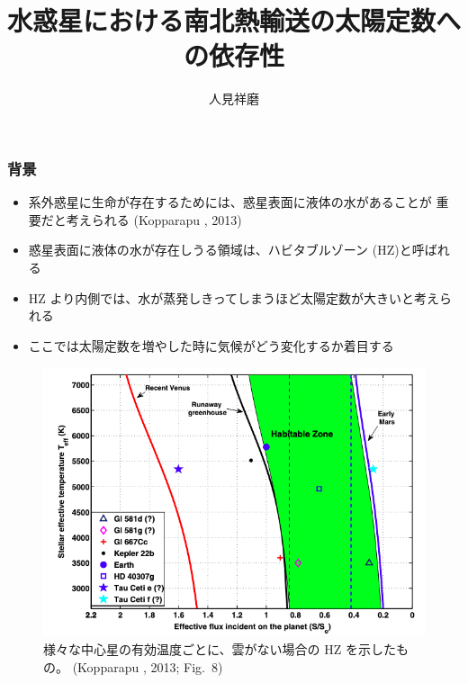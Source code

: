 \documentclass[aspectratio=149,9pt,fleqn]{beamer}
\institute{北海道大学大学院理学院 地球流体力学研究室 M2}
\author{人見祥磨}
\title{水惑星における南北熱輸送の太陽定数への依存性}
\begin{document}
\maketitle

\begin{frame}
	\frametitle{背景}
	\begin{itemize}
		\item 系外惑星に生命が存在するためには、惑星表面に液体の水があることが
			重要だと考えられる (Kopparapu \etal*, 2013)
		\item 惑星表面に液体の水が存在しうる領域は、ハビタブルゾーン (HZ)と呼ばれる
		\item HZ より内側では、水が蒸発しきってしまうほど太陽定数が大きいと考えられる
		\item ここでは太陽定数を増やした時に気候がどう変化するか着目する
	\end{itemize}
	\begin{figure}
		\centering\scriptsize
		\includegraphics[width=.5\textwidth]{kopparapu8.png}\\
		様々な中心星の有効温度ごとに、雲がない場合の HZ を示したもの。
		(Kopparapu \etal*, 2013; Fig.\ 8)
	\end{figure}
\end{frame}
\end{document}
